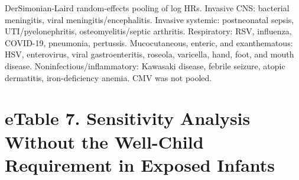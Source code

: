 \documentclass[11pt]{article}
\begin{document}
\begin{landscape}
DerSimonian-Laird random-effects pooling of log HRs.
Invasive CNS: bacterial meningitis, viral
meningitis/encephalitis. Invasive systemic: postneonatal
sepsis, UTI/pyelonephritis, osteomyelitis/septic arthritis.
Respiratory: RSV, influenza, COVID-19, pneumonia, pertussis.
Mucocutaneous, enteric, and exanthematous: HSV, enterovirus,
viral gastroenteritis, roseola, varicella, hand, foot, and
mouth disease. Noninfectious/inflammatory: Kawasaki disease,
febrile seizure, atopic dermatitis, iron-deficiency anemia.
CMV was not pooled.

\newpage

\hypertarget{etable-7.-sensitivity-analysis-without-the-well-child-requirement-in-exposed-infants}{%
\section*{eTable 7. Sensitivity Analysis Without the
Well-Child Requirement in Exposed
Infants}\label{etable-7.-sensitivity-analysis-without-the-well-child-requirement-in-exposed-infants}}


\end{landscape}
\end{document}
